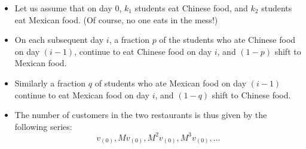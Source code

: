 \begin{frame}
\begin{columns}
    \begin{overlayarea}{\textwidth}{\textheight}
      \begin{itemize}\justifying
         \item Let us assume that on day $0$, $k_1$ students eat Chinese food,
              and $k_2$ students eat Mexican food. (Of course, no one eats in the mess!)
               \item On each subsequent day $i$, a fraction $p$ of the students who ate
              Chinese food on day $(i-1)$, continue to eat Chinese food on day $i$, and $(1-p)$
              shift to Mexican food.
               \item Similarly a fraction $q$ of students who ate Mexican food on day $(i-1)$
              continue to eat Mexican food on day $i$, and $(1-q)$ shift to Chinese food.
               \item The number of customers in the two restaurants is thus given by the
              following series:
              \[
                v_{(0)}, Mv_{(0)}, M^2v_{(0)}, M^3v_{(0)}, \dots
              \]
      \end{itemize}
    \end{overlayarea}
  \end{columns}
\end{frame}


\begin{frame}
  \begin{columns}
    \begin{overlayarea}{\textwidth}{\textheight}
      \vspace{1in}
      \begin{center}
        
      \end{center}
    \end{overlayarea}
    \begin{overlayarea}{\textwidth}{\textheight}
    \end{overlayarea}
  \end{columns}
\end{frame}

